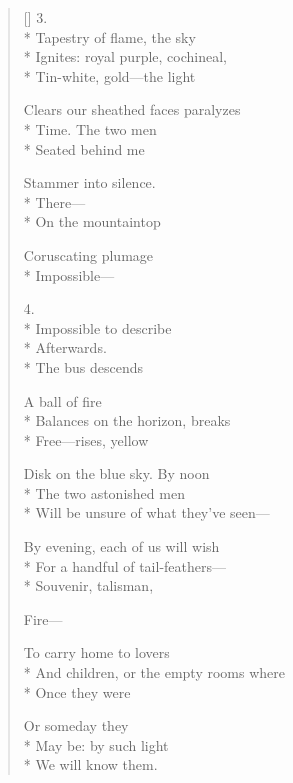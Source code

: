 \begin{verse}[\versewidth]
3.\\*
Tapestry of flame, the sky\\*
Ignites: royal purple, cochineal,\\*
Tin-white, gold---the light

Clears our sheathed faces       paralyzes\\*
Time.         The two men\\*
Seated behind me

Stammer into silence.\\*
                                         There---\\*
On the mountaintop

Coruscating plumage\\*
Impossible---

4.\\*
Impossible to describe\\*
Afterwards.\\*
                             The bus descends

A ball of fire\\*
Balances on the horizon, breaks\\*
Free---rises, yellow

Disk on the blue sky.            By noon\\*
The two astonished men\\*
Will be unsure of what they've seen---

By evening, each of us will wish\\*
For a handful of tail-feathers---\\*
Souvenir, talisman,

Fire---

To carry home to lovers\\*
And children, or the empty rooms where\\*
Once they were

Or someday they\\*
May be: by such light\\*
We will know them.
\end{verse}
